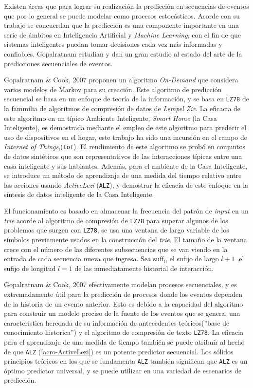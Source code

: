 Existen áreas que para lograr su realización la predicción en secuencias de eventos que por lo general se puede modelar como procesos estocásticos.
Acorde con su trabajo se concuerdan que la predicción es una componente importante en una serie de ámbitos en Inteligencia Artificial y \emph{Machine Learning}, con el fin de que sistemas inteligentes puedan tomar decisiones cada vez más informadas y confiables.  Gopalratnam \etal\cite{Gopalratnam2007} estudian y dan un gran estudio al estado del arte de la predicciones secuenciales de eventos.

Gopalratnam \& Cook, 2007 \etal\cite{Gopalratnam2007} proponen un algoritmo \emph{On-Demand} que considera varios modelos de Markov para su creación.  Este algoritmo de predicción secuencial se basa en un enfoque de teoría de la información, y se basa en \texttt{LZ78} de la fammilia de algoritmos de compresión de datos de \emph{Lempel Ziv}. La eficacia de este algoritmo en un típico {Ambiente Inteligente}, \emph{Smart Home} (la Casa Inteligente), es demostrada mediante el empleo de este algoritmo para predecir el uso de dispositivos en el hogar, este trabajo ha sido una incursión en el campo de \emph{Internet of Things},(\texttt{IoT}). El rendimiento de este algoritmo se probó en conjuntos de datos sintéticos que son representativos de las interacciones típicas entre una casa inteligente y sus habiantes. Además, para el ambiente de la Casa Inteligente, se introduce un método de aprendizaje de una medida del tiempo relativo entre las acciones usando \emph{ActiveLezi} (\texttt{ALZ})\label{acro-ActiveLezi}, y demostrar la eficacia de este enfoque en la síntesis de datos inteligente de la Casa Inteligente.

El funcionamiento es basado en almacenar la frecuencia del patrón de \emph{input} en un \emph{trie} acorde al algoritmo de compresión de \texttt{LZ78} para superar algunos de los problemas que surgen con \texttt{LZ78}, se usa una ventana de largo variable de los símbolos previamente usados en la construcción del \emph{trie}. El tamaño de la ventana crece con el número de las diferentes subsecuencias que se van viendo en la entrada de cada secuencia nueva que ingresa.  Sea ${\mbox{suff}}_{l}$,  el sufijo de largo $l+1$ ,el sufijo de longitud $l=1$ de las inmediatamente historial de interacción.%

Gopalratnam \& Cook, 2007 \etal\cite{Gopalratnam2007} efectivamente modelan procesos secuenciales, y es extremadamente útil para la predicción de procesos donde los eventos dependen de la historia de un evento anterior. Esto es debido a la capacidad del algoritmo para construir un modelo preciso de la fuente de los eventos que se genera, una característica heredada de su información de antecedentes teóricos(''base de conocimiento historica'') y el algoritmo de compresión de texto \texttt{LZ78}. La eficacia para el aprendizaje de una medida de tiempo también se puede atribuir al hecho de que \texttt{ALZ} (\ref{acro-ActiveLezi}) es un potente predictor secuencial. Los sólidos principios teóricos en los que se fundamenta \texttt{ALZ} también significan que \texttt{ALZ} es un óptimo predictor universal, y se puede utilizar en una variedad de escenarios de predicción.
	
  	
  	  